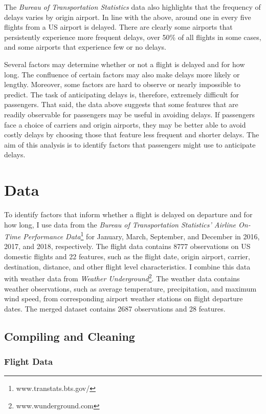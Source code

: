 \documentclass[
]{article}
\begin{document}
The \textit{Bureau of Transportation Statistics} data also highlights
that the frequency of delays varies by origin airport. In line with the
above, around one in every five flights from a US airport is delayed.
There are clearly some airports that persistently experience more
frequent delays, over 50\% of all flights in some cases, and some
airports that experience few or no delays.

Several factors may determine whether or not a flight is delayed and for
how long. The confluence of certain factors may also make delays more
likely or lengthy. Moreover, some factors are hard to observe or nearly
impossible to predict. The task of anticipating delays is, therefore,
extremely difficult for passengers. That said, the data above suggests
that some features that are readily observable for passengers may be
useful in avoiding delays. If passengers face a choice of carriers and
origin airports, they may be better able to avoid costly delays by
choosing those that feature less frequent and shorter delays. The aim of
this analysis is to identify factors that passengers might use to
anticipate delays.

\newpage 
\section{Data}

To identify factors that inform whether a flight is delayed on departure
and for how long, I use data from the
\textit{Bureau of Transportation Statistics' Airline On-Time Performance Data}\footnote{www.transtats.bts.gov/}
for January, March, September, and December in 2016, 2017, and 2018,
respectively. The flight data contains 8777 observations on US domestic
flights and 22 features, such as the flight date, origin airport,
carrier, destination, distance, and other flight level characteristics.
I combine this data with weather data from
\textit{Weather Underground}\footnote{www.wunderground.com}. The weather
data contains weather observations, such as average temperature,
precipitation, and maximum wind speed, from corresponding airport
weather stations on flight departure dates. The merged dataset contains
2687 observations and 28 features.

\subsection{Compiling and Cleaning}

\subsubsection{Flight Data}
\end{document}
